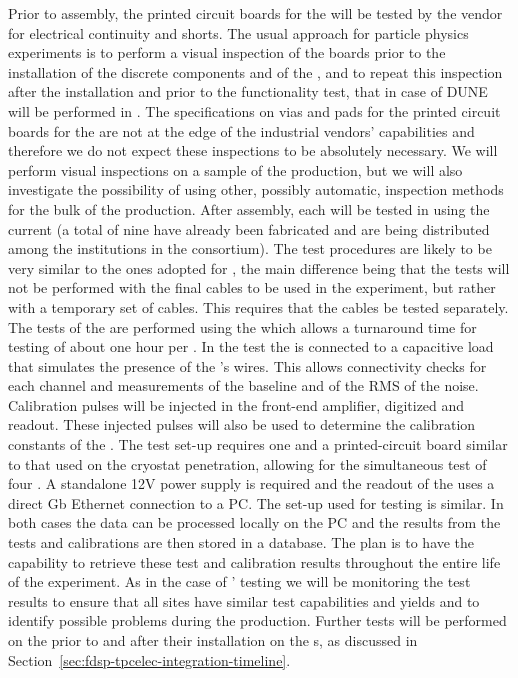 Prior to assembly, the printed circuit boards for the
 will be tested by the vendor for electrical
continuity and shorts. The usual approach for particle physics
experiments is to perform a visual inspection of the boards
prior to the installation of the discrete components and of
the , and to repeat this inspection after the
installation and prior to the functionality test, that in
case of DUNE will be performed in \lntwo. The
specifications on vias and pads for the printed circuit
boards for the  are not at the edge of the
industrial vendors' capabilities and therefore we do not
expect these inspections to be absolutely necessary. We will
perform visual inspections on a sample of the 
production, but we will also investigate the possibility
of using other, possibly automatic, inspection methods for
the bulk of the production. After assembly, 
each  will be tested in \lntwo using
the current  (a total of nine have already been
fabricated and are being distributed among the institutions
in the consortium). The test procedures are likely to be
very similar to the ones adopted for , the main
difference being that the tests will not be performed with
the final cables to be used in the experiment, but rather
with a temporary set of cables. This requires that the 
cables be tested separately. The tests of the 
are performed using the  which allows a turnaround
time for testing of about one hour per . In the
test the  is connected to a capacitive load that
simulates the presence of the 's wires. This allows
connectivity checks for each channel and measurements of
the baseline and of the RMS of the noise. Calibration 
pulses will be injected in the front-end amplifier, digitized
and readout. These injected pulses will also be used
to determine the calibration constants of the . 
The test set-up requires one  and
a printed-circuit board similar to that used on the cryostat
penetration, allowing for the simultaneous test of four .
A standalone 12V power supply is required and the readout
of the  uses a direct Gb Ethernet connection to
a PC. The set-up used for  testing is similar.
In both cases the data can be processed locally on the PC
and the results from the tests and calibrations are then stored 
in a database. The plan is to have the capability to retrieve  
these test and calibration results throughout the entire life
of the experiment. As in the case of ' testing
we will be monitoring the test results to ensure that all
sites have similar test capabilities and yields and to
identify possible problems during the production.
Further tests will be performed on the 
prior to and after their installation on the s, as
discussed in Section~\ref{sec:fdsp-tpcelec-integration-timeline}.

